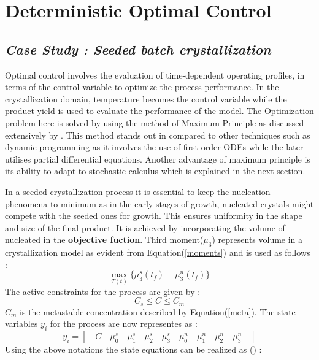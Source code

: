 \documentclass[3p,times,authoryear]{elsarticle}
\begin{document}
\section{Deterministic Optimal Control}\label{secdet}

\subsection{\textit{Case Study : Seeded batch crystallization}}
Optimal control involves the evaluation of time-dependent operating profiles, in terms of the control variable to optimize the process performance. In the crystallization domain, temperature becomes the control variable while the product yield is used to evaluate the performance of the model. The Optimization problem here is solved by using the method of Maximum Principle as discussed extensively by \cite{diwekar}. This method stands out in compared to other techniques such as dynamic programming as it involves the use of first order ODEs while the later utilises partial differential equations. Another advantage of maximum principle is its ability to adapt to stochastic calculus which is explained in the next section. \par 
In a seeded crystallization process it is essential to keep the nucleation phenomena to minimum as in the early stages of growth, nucleated crystals might compete with the seeded ones for growth. This ensures uniformity in the shape and size of the final product. It is achieved by incorporating the volume of nucleated in the \textbf{objective fuction}. Third moment($\mu_{3}$) represents volume in a crystallization model as evident from Equation(\ref{moments}) and is used as follows :
\begin{equation}
\max_{T(t)}\lbrace{\mu_{3}^{s}(t_{f}) - \mu_{3}^{n}(t_{f})\rbrace } 
\end{equation}
The active constraints for the process are given by : 
\begin{equation}
C_{s}\leqslant C \leqslant C_{m}
\end{equation}
$C_{m}$ is the metastable concentration described by Equation(\ref{meta}). The state variables $y_{i}$ for the process are now representes as : 
\begin{equation} \label{states}
y_{i} = \left[\quad C \quad \mu_{0}^{s} \quad \mu_{1}^{s}\quad \mu_{2}^{s}\quad \mu_{3}^{s}\quad \mu_{0}^{n}\quad \mu_{1}^{n}\quad \mu_{2}^{n}\quad \mu_{3}^{n}\quad\right]  
\end{equation}
Using the above notations the state equations can be realized as (\cite{yenkie}) :
\end{document}
